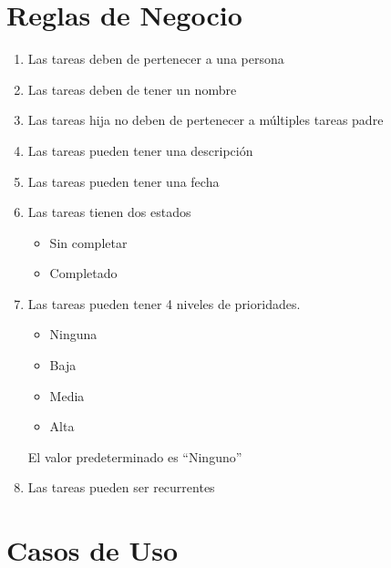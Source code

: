 \section{Reglas de Negocio}
\begin{enumerate}[start=1, label={RN\arabic*.}]
  \item Las tareas deben de pertenecer a una persona \label{rn:user}
  \item Las tareas deben de tener un nombre \label{rn:nombre}
  \item Las tareas hija no deben de pertenecer a m\'ultiples tareas padre \label{rn:thija}
  \item Las tareas pueden tener una descripci\'on \label{rn:desc}
  \item Las tareas pueden tener una fecha \label{rn:fecha}
  \item Las tareas tienen dos estados \label{rn:estado}
    \begin{itemize}
      \item Sin completar
      \item Completado
    \end{itemize}
  \item Las tareas pueden tener 4 niveles de prioridades. \label{rn:prioridad}
    \begin{itemize}
      \item Ninguna
      \item Baja
      \item Media
      \item Alta
    \end{itemize}
    El valor predeterminado es ``Ninguno''
  \item Las tareas pueden ser recurrentes
\end{enumerate}
	\section{Casos de Uso}
	 
    
